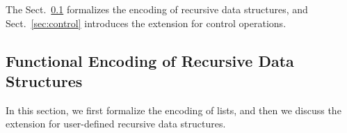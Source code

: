 The Sect.~\ref{sec:recdata} formalizes the encoding of recursive data
structures, and Sect.~\ref{sec:control} introduces the extension for
control operations.

\subsection{Functional Encoding of Recursive Data Structures}
\label{sec:recdata}

In this section, we first formalize the encoding of lists, and then we discuss the
extension for user-defined recursive data structures.

%
%
%

